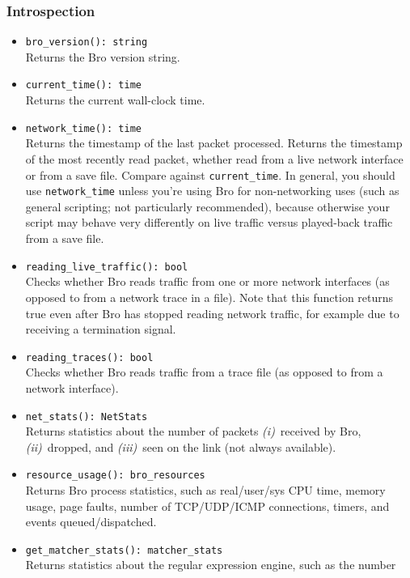 \documentclass[10pt,landscape]{article}
\newcommand{\first}{\emph{(i)}~}
\newcommand{\second}{\emph{(ii)}~}
\newcommand{\third}{\emph{(iii)}~}
\begin{document}
\begin{multicols*}{2}
\subsubsection*{Introspection}

\begin{itemize}
  \item \verb|bro_version(): string|\\
    Returns the Bro version string.
  \item \verb|current_time(): time|\\
    Returns the current wall-clock time.
  \item \verb|network_time(): time|\\
    Returns the timestamp of the last packet processed.
    Returns the timestamp of the most recently read packet, whether read from a
    live network interface or from a save file. Compare against
    \verb|current_time|. In general, you should use \verb|network_time| unless
    you're using Bro for non-networking uses (such as general scripting; not
    particularly recommended), because otherwise your script may behave very
    differently on live traffic versus played-back traffic from a save file.
  \item \verb|reading_live_traffic(): bool|\\
    Checks whether Bro reads traffic from one or more network interfaces (as
    opposed to from a network trace in a file). Note that this function returns
    true even after Bro has stopped reading network traffic, for example due to
    receiving a termination signal.
  \item \verb|reading_traces(): bool|\\
    Checks whether Bro reads traffic from a trace file (as opposed to
    from a network interface).
  \item \verb|net_stats(): NetStats|\\
    Returns statistics about the number of packets
    \first received by Bro,
    \second dropped,
    and \third seen on the link (not always available).
  \item \verb|resource_usage(): bro_resources|\\
    Returns Bro process statistics, such as real/user/sys CPU time, memory
    usage, page faults, number of TCP/UDP/ICMP connections, timers, and events
    queued/dispatched.
  \item \verb|get_matcher_stats(): matcher_stats|\\
    Returns statistics about the regular expression engine, such as the number

\end{itemize}
\end{multicols*}
\end{document}

